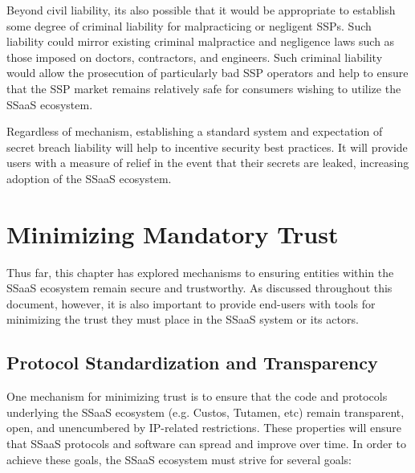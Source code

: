 Beyond civil liability, its also possible that it would be appropriate
to establish some degree of criminal liability for malpracticing or
negligent SSPs. Such liability could mirror existing criminal
malpractice and negligence laws such as those imposed on doctors,
contractors, and engineers. Such criminal liability would allow the
prosecution of particularly bad SSP operators and help to ensure that
the SSP market remains relatively safe for consumers wishing to
utilize the SSaaS ecosystem.

Regardless of mechanism, establishing a standard system and
expectation of secret breach liability will help to incentive security
best practices. It will provide users with a measure of relief in the
event that their secrets are leaked, increasing adoption of the SSaaS
ecosystem.

\section{Minimizing Mandatory Trust}

Thus far, this chapter has explored mechanisms to ensuring entities
within the SSaaS ecosystem remain secure and trustworthy. As discussed
throughout this document, however, it is also important to provide
end-users with tools for minimizing the trust they must place in the
SSaaS system or its actors. 

\subsection{Protocol Standardization and Transparency}

One mechanism for minimizing trust is to ensure that the code and
protocols underlying the SSaaS ecosystem (e.g. Custos, Tutamen, etc)
remain transparent, open, and unencumbered by IP-related
restrictions. These properties will ensure that SSaaS protocols and
software can spread and improve over time. In order to achieve these
goals, the SSaaS ecosystem must strive for several goals:

